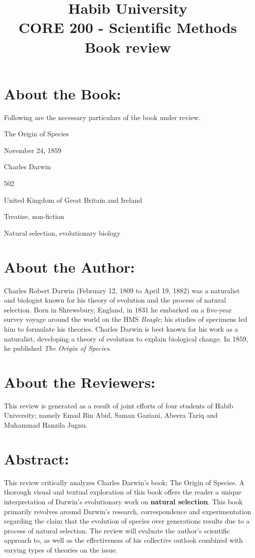 \documentclass{article}
\title{\textbf{Habib University}\\ \textbf{CORE 200 - Scientific Methods}\\ \textbf{Book review}}
\begin{document}
\maketitle

%

\section*{About the Book:}
	Following are the necessary particulars of the book under review. \\
	\begin{description}[font=$\bullet$~\normalfont\scshape\color{red!50!black}]
		\item [Book] The Origin of Species
		\item [Originally published] November 24, 1859
		\item [Author] Charles Darwin
		\item [Page count] 502
		\item [Country] United Kingdom of Great Britain and Ireland
		\item [Genres] Treatise, non-fiction
		\item [Subjects] Natural selection, evolutionary biology
	\end{description}
 

\section*{About the Author:}
	Charles Robert Darwin (February 12, 1809 to April 19, 1882) was a naturalist and biologist known for his theory of evolution and the process of natural selection. Born in Shrewsbury, England, in 1831 he embarked on a five-year survey voyage around the world on the HMS \textit{Beagle}; his studies of specimens led him to formulate his theories. Charles Darwin is best known for his work as a naturalist, developing a theory of evolution to explain biological change. In 1859, he published \textit{The Origin of Species}. 
	
\section*{About the Reviewers:}
	This review is generated as a result of joint efforts of four students of Habib University; namely Emad Bin Abid, Saman Gaziani, Abeera Tariq and Muhammad Hanzila Jugnu.
\pagebreak

\section*{Abstract:}
	This review critically analyzes Charles Darwin's book; The Origin of Species. A thorough visual and textual exploration of this book offers the reader a unique interpretation of Darwin's evolutionary work on \textbf{natural selection}. This book primarily revolves around Darwin's research, correspondence and experimentation regarding the claim that the evolution of species over generations results due to a process of natural selection. The review will evaluate the author's scientific approach to, as well as the effectiveness of his collective outlook combined with varying types of theories on the issue.
\end{document}
